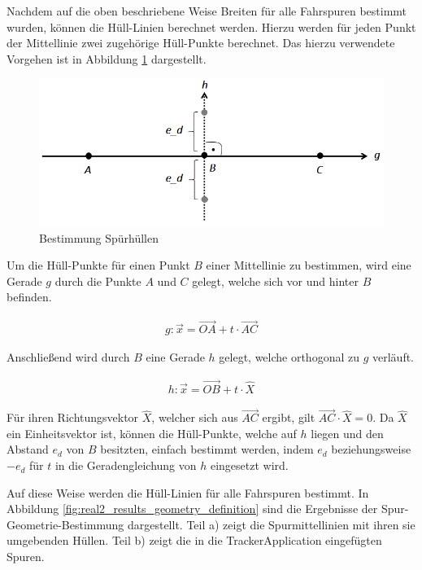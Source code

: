 Nachdem auf die oben beschriebene Weise Breiten für alle Fahrspuren bestimmt wurden, können die Hüll-Linien
berechnet werden. Hierzu werden für jeden Punkt der Mittellinie zwei zugehörige Hüll-Punkte berechnet.
Das hierzu verwendete Vorgehen ist in Abbildung \ref{fig:real2_envelope_definition_concept} dargestellt.

\begin{figure}[H]
    \centering
    \includegraphics[width=0.5\linewidth]{../resources/img/umsetzung/U2/calc_env_point}
    \caption{Bestimmung Spürhüllen}
    \label{fig:real2_envelope_definition_concept}
\end{figure}

Um die Hüll-Punkte für einen Punkt $B$ einer Mittellinie zu bestimmen, wird eine Gerade $g$ durch die
Punkte $A$ und $C$ gelegt, welche sich vor und hinter $B$ befinden.

\begin{ceqn}
\begin{align}
    g: \vec{x} = \overrightarrow{OA} + t \cdot \overrightarrow{AC}
\end{align}
\end{ceqn}

Anschließend wird durch $B$ eine Gerade $h$ gelegt, welche orthogonal zu $g$ verläuft.

\begin{ceqn}
\begin{align}
    h: \vec{x} = \overrightarrow{OB} + t \cdot \hat{X}
\end{align}
\end{ceqn}

Für ihren Richtungsvektor $\hat{X}$, welcher sich aus $\overrightarrow{AC}$ ergibt, gilt
$\overrightarrow{AC} \cdot \hat{X} = 0$. Da $\hat{X}$ ein Einheitsvektor
ist, können die Hüll-Punkte, welche auf $h$ liegen und den Abstand $e_d$ von $B$ besitzten, einfach
bestimmt werden, indem $e_d$ beziehungsweise $-e_d$ für $t$ in die Geradengleichung von $h$ eingesetzt wird.

Auf diese Weise werden die Hüll-Linien für alle Fahrspuren bestimmt. In Abbildung \ref{fig:real2_results_geometry_definition} sind die
Ergebnisse der Spur-Geometrie-Bestimmung dargestellt. Teil a) zeigt die Spurmittellinien mit ihren
sie umgebenden Hüllen. Teil b) zeigt die in die TrackerApplication eingefügten Spuren. 

